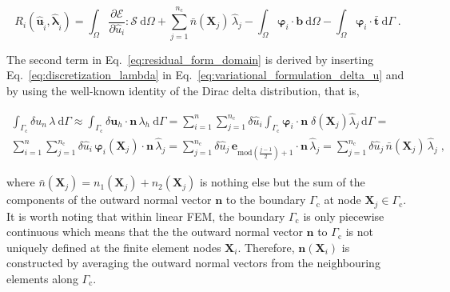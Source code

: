 \documentclass[10pt,a4paper]{article}
\begin{document}
\begin{equation}
	R_i ( \hat{\mathbf{u}}_{\hat{i}} , \hat{\boldsymbol{\lambda}}_{\hat{i}} ) = \int_{\Omega} \frac{\partial \boldsymbol{\mathcal{E}}}{\partial \hat{u}_i} : \boldsymbol{\mathcal{S}} \: \text{d} \Omega + \sum_{j = 1}^{n_{\text{c}}} \bar{n} (\mathbf{X}_j) \, \hat{\lambda}_j - \int_{\Omega} \boldsymbol{\varphi}_i \cdot \mathbf{b} \: \text{d} \Omega - \int_{\Omega} \boldsymbol{\varphi}_i \cdot \bar{\mathbf{t}} \: \text{d} \Gamma \;. \label{eq:residual_form_domain}
\end{equation}

The second term in Eq.~\eqref{eq:residual_form_domain} is derived by inserting Eq.~\eqref{eq:discretization_lambda} in Eq.~\eqref{eq:variational_formulation_delta_u} and by using the well-known identity of the Dirac delta distribution, that is,

\begin{align}
	\int_{\Gamma_{\text{c}}} \delta u_n \, \lambda \: \text{d} \Gamma \approx \int_{\Gamma_{\text{c}}} \delta \mathbf{u}_h \cdot \mathbf{n} \, \lambda_h \: \text{d} \Gamma \nonumber = \sum_{i = 1}^{n} \sum_{j = 1}^{n_{\text{c}}} \delta \hat{u}_i \int_{\Gamma_{\text{c}}} \boldsymbol{\varphi}_i \cdot \mathbf{n} \; \delta (\mathbf{X}_j) \hat{\lambda}_j  \, \text{d} \Gamma = \nonumber \\
	\sum_{i = 1}^n \sum_{j = 1}^{n_{\text{c}}} \delta \hat{u}_i \, \boldsymbol{\varphi}_i (\mathbf{X}_j) \cdot \mathbf{n} \, \hat{\lambda}_j = \sum_{j = 1}^{n_{\text{c}}} \delta \hat{u}_j \, \mathbf{e}_{\text{mod} \left( \frac{j - 1}{2} \right) + 1} \cdot \mathbf{n}  \, \hat{\lambda}_j = \sum_{j = 1}^{n_{\text{c}}} \delta \hat{u}_j \, \bar{n} (\mathbf{X}_j) \, \hat{\lambda}_j \nonumber \;,
\end{align}

where $\bar{n} (\mathbf{X}_j) = n_1 (\mathbf{X}_j) + n_2 (\mathbf{X}_j)$ is nothing else but the sum of the components of the outward normal vector $\mathbf{n}$ to the boundary $\Gamma_{\text{c}}$ at node $\mathbf{X}_j \in \Gamma_{\text{c}}$.\\

It is worth noting that within linear FEM, the boundary $\Gamma_{\text{c}}$ is only piecewise continuous which means that the the outward normal vector $\mathbf{n}$ to $\Gamma_{\text{c}}$ is not uniquely defined at the finite element nodes $\mathbf{X}_i$. Therefore, $\mathbf{n}(\mathbf{X}_i)$ is constructed by averaging the outward normal vectors from the neighbouring elements along $\Gamma_{\text{c}}$.\\
\end{document}
